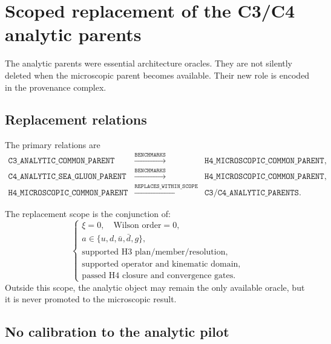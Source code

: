 \documentclass[11pt]{article}
\begin{document}
\section{Scoped replacement of the C3/C4 analytic parents}
\label{sec:replacement}

The analytic parents were essential architecture oracles.  They are not
silently deleted when the microscopic parent becomes available.  Their new
role is encoded in the provenance complex.

\subsection{Replacement relations}

The primary relations are
\begin{equation}
 \begin{array}{rcl}
 \texttt{C3\_ANALYTIC\_COMMON\_PARENT}
 &\xrightarrow{\texttt{BENCHMARKS}}&
 \texttt{H4\_MICROSCOPIC\_COMMON\_PARENT},\\[1mm]
 \texttt{C4\_ANALYTIC\_SEA\_GLUON\_PARENT}
 &\xrightarrow{\texttt{BENCHMARKS}}&
 \texttt{H4\_MICROSCOPIC\_COMMON\_PARENT},\\[1mm]
 \texttt{H4\_MICROSCOPIC\_COMMON\_PARENT}
 &\xrightarrow{\texttt{REPLACES\_WITHIN\_SCOPE}}&
 \texttt{C3/C4\_ANALYTIC\_PARENTS}.
 \end{array}
 \label{eq:h4-replacement-relations}
\end{equation}

The replacement scope is the conjunction of:
\begin{equation}
 \left\{
 \begin{array}{l}
 \xi=0,\quad\text{Wilson order}=0,\\
 a\in\{u,d,\bar u,\bar d,g\},\\
 \text{supported H3 plan/member/resolution},\\
 \text{supported operator and kinematic domain},\\
 \text{passed H4 closure and convergence gates}.
 \end{array}
 \right.
 \label{eq:h4-replacement-scope}
\end{equation}
Outside this scope, the analytic object may remain the only available oracle,
but it is never promoted to the microscopic result.

\subsection{No calibration to the analytic pilot}
\end{document}
